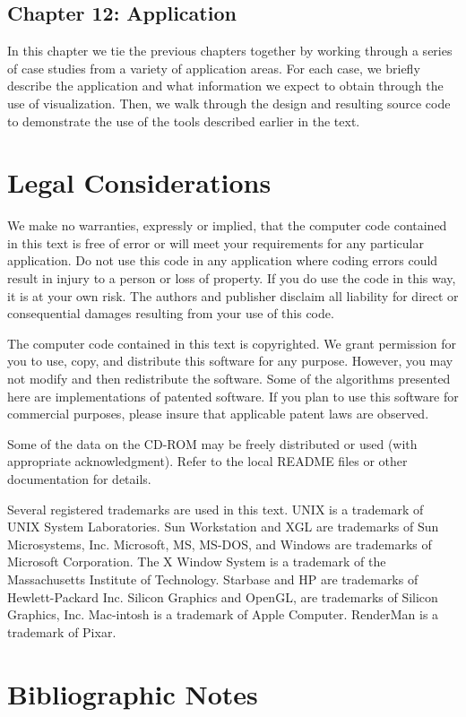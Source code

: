 \subsection*{Chapter 12: Application}

In this chapter we tie the previous chapters together by working through a series of case studies from a variety of application areas. For each case, we briefly describe the application and what information we expect to obtain through the use of visualization. Then, we walk through the design and resulting source code to demonstrate the use of the tools described earlier in the text.

\section{Legal Considerations}

We make no warranties, expressly or implied, that the computer code contained in this text is free of error or will meet your requirements for any particular application. Do not use this code in any application where coding errors could result in injury to a person or loss of property. If you do use the code in this way, it is at your own risk. The authors and publisher disclaim all liability for direct or consequential damages resulting from your use of this code.

The computer code contained in this text is copyrighted. We grant permission for you to use, copy, and distribute this software for any purpose. However, you may not modify and then redistribute the software. Some of the algorithms presented here are implementations of patented software. If you plan to use this software for commercial purposes, please insure that applicable patent laws are observed.

Some of the data on the CD-ROM may be freely distributed or used (with appropriate acknowledgment). Refer to the local README files or other documentation for details.

Several registered trademarks are used in this text. UNIX is a trademark of UNIX System Laboratories. Sun Workstation and XGL are trademarks of Sun Microsystems, Inc. Microsoft, MS, MS-DOS, and Windows are trademarks of Microsoft Corporation. The X Window System is a trademark of the Massachusetts Institute of Technology. Starbase and HP are trademarks of Hewlett-Packard Inc. Silicon Graphics and OpenGL, are trademarks of Silicon Graphics, Inc. Mac-intosh is a trademark of Apple Computer. RenderMan is a trademark of Pixar.
\section{Bibliographic Notes}

